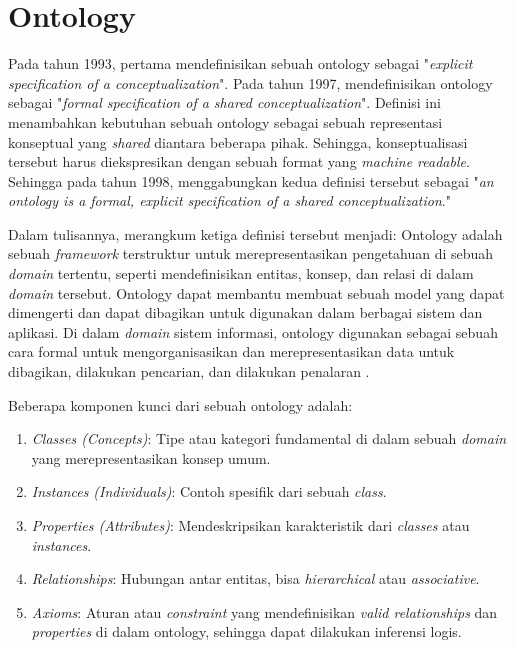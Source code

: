 \section{Ontology}
\label{sec:ontology}

Pada tahun 1993, \cite{gruber1993translation} pertama mendefinisikan sebuah ontology sebagai "\textit{explicit specification of a conceptualization}". Pada tahun 1997, \cite{borst1997construction} mendefinisikan ontology sebagai "\textit{formal specification of a shared conceptualization}". Definisi ini menambahkan kebutuhan sebuah ontology sebagai sebuah representasi konseptual yang \textit{shared} diantara beberapa pihak. Sehingga, konseptualisasi tersebut harus diekspresikan dengan sebuah format yang \textit{machine readable}. Sehingga pada tahun 1998, \cite{studer1998knowledge} menggabungkan kedua definisi tersebut sebagai "\textit{an ontology is a formal, explicit specification of a shared conceptualization}."

Dalam tulisannya, \cite{Guarino2009} merangkum ketiga definisi tersebut menjadi: Ontology adalah sebuah \textit{framework} terstruktur untuk merepresentasikan pengetahuan di sebuah \textit{domain} tertentu, seperti mendefinisikan entitas, konsep, dan relasi di dalam \textit{domain} tersebut. Ontology dapat membantu membuat sebuah model yang dapat dimengerti dan dapat dibagikan untuk digunakan dalam berbagai sistem dan aplikasi. Di dalam \textit{domain} sistem informasi, ontology digunakan sebagai sebuah cara formal untuk mengorganisasikan dan merepresentasikan data untuk dibagikan, dilakukan pencarian, dan dilakukan penalaran \parencite{Guarino2009}. 

Beberapa komponen kunci dari sebuah ontology adalah:

\begin{enumerate}
  \item \textit{Classes (Concepts)}: Tipe atau kategori fundamental di dalam sebuah \textit{domain} yang merepresentasikan konsep umum.
  \item \textit{Instances (Individuals)}: Contoh spesifik dari sebuah \textit{class}.
  \item \textit{Properties (Attributes)}: Mendeskripsikan karakteristik dari \textit{classes} atau \textit{instances}.
  \item \textit{Relationships}: Hubungan antar entitas, bisa \textit{hierarchical} atau \textit{associative}.
  \item \textit{Axioms}: Aturan atau \textit{constraint} yang mendefinisikan \textit{valid relationships} dan \textit{properties} di dalam ontology, sehingga dapat dilakukan inferensi logis.
\end{enumerate}

